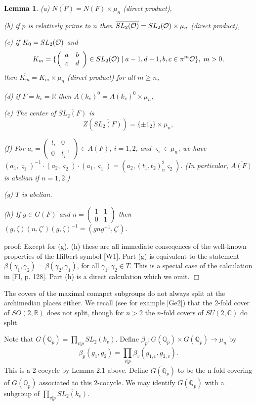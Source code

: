 \documentclass[12pt]{article}
\newtheorem{lemma}[theorem]{Lemma}
\def\qqq{\mathbb{Q}}
\begin{document}
\begin{lemma}
(a) $\overline{N(F)}=N(F)\times \mu _n$ (direct product),

(b) if $p$ is relatively prime to $n$ then 
$\overline{SL_2({\cal{O}})}=SL_2({\cal{O}})\times \mu _n$ 
(direct product),

(c) if $K_0=SL_2({\cal{O}})$ and 
\[
K_m=\{\left( 
\begin{array}{cc}
a & b \\ 
c & d
\end{array}
\right) \in SL_2({\cal{O}})\;|\;a-1,d-1,b,c\in \pi ^m{\cal{O}}\},\;m>0,
\]
then $\overline{K_m}=K_m\times \mu _n$ (direct product) for all $m\geq n$,

(d) if $F=k_v=\mathbb{R}$ then 
$\overline{A(k_v)^0}=A(k_v)^0\times \mu _n$,

(e) The center of $\overline{SL_2(F)}$ is 
\[
Z(\overline{SL_2(F)})=
\{\pm 1_2\}\times \mu _n,
\]

(f) For $a_i=\left( 
\begin{array}{cc}
t_i & 0 \\ 
0 & t_i^{-1}
\end{array}
\right) \in A(F)$, $i=1,2$, and $\varsigma _i\in \mu _n$,
we have $(a_1,\varsigma _1)^{-1}\cdot
(a_2,\varsigma _2)\cdot (a_1,\varsigma
_1)=(a_2,(t_1,t_2)_n^2\varsigma _2)$.
(In particular, $\overline{A(F)}$ is abelian if $n=1,2$.)

(g) $ \overline{T}$ is abelian.

(h) If $g\in G(F)$ and
$n=
\left(
\begin{array}{cc}
1 & 1\\
0 & 1
\end{array}
\right)
$
then $(g,\zeta)(n,\zeta ')(g,\zeta)^{-1}
=(gng^{-1},\zeta')$.
\end{lemma}

proof: Except for (g), (h)
these are all immediate conseqences of the well-known properties of
the Hilbert symbol [W1]. Part (g) is equivalent to the statement
$\beta(\gamma_1, \gamma_2)=\beta(\gamma_2, \gamma_1)$,
for all $\gamma_1, \gamma_2\in T$. This 
is a special case of the calculation in [Fl, p. 128].
Part (h) is a direct calculation which we omit. 
$\Box $

The covers of the maximal comapct subgroups do not always split
at the archimedian places either.
We recall (see for example [Ge2]) that the $2$-fold cover of 
$SO(2,{\mathbb R})$ does not split, though for $n>2$ the $n$-fold
covers of $SU(2,{\mathbb C})$ do split.

Note that $G(\qqq_p)=\prod_{v|p}SL_2(k_v)$. Define 
$\beta _p:G(\qqq_p)\times G(\qqq_p)\rightarrow \mu _n$ by 
\[
\beta _p(g_1,g_2)=\prod_{v|p}\beta _v(g_{1,v},g_{2,v}).  
\]
This is a 2-cocycle by Lemma 2.1 above. Define
$\overline{G(\qqq_p)}$ to be
the n-fold covering of $G(\qqq_p)$ associated to this 2-cocycle. We may
identify $\overline{G(\qqq_p)}$ with a subgroup of 
$\prod_{v|p}\overline{SL_2(k_v)}$.
\end{document}
